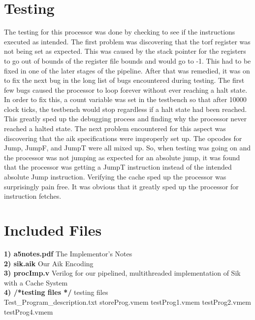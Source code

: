 \documentclass[12pt, twocolumn]{scrartcl}
\begin{document}
\section*{Testing}
The testing for this processor was done by checking to see if the instructions executed as intended. The first problem was discovering that the torf register was not being set as expected. This was caused by the stack pointer for the registers to go out of bounds of the register file bounds and would go to -1. This had to be fixed in one of the later stages of the pipeline. After that was remedied, it was on to fix the next bug in the long list of bugs encountered during testing. 
The first few bugs caused the processor to loop forever without ever reaching a halt state. In order to fix this, a count variable was set in the testbench so that after 10000 clock ticks, the testbench would stop regardless if a halt state had been reached. This greatly sped up the debugging process and finding why the processor never reached a halted state. 
The next problem encountered for this aspect was discovering that the aik specifications were improperly set up. The opcodes for Jump, JumpF, and JumpT were all mixed up. So, when testing was going on and the processor was not jumping as expected for an absolute jump, it was found that the processor was getting a JumpT instruction instead of the intended absolute Jump instruction.
Verifying the cache sped up the processor was surprisingly pain free. It was obvious that it greatly sped up the processor for instruction fetches.

\section*{Included Files}
\textbf {1) a5notes.pdf} The Implementor's Notes \\
\textbf {2) sik.aik} Our Aik Encoding \\
\textbf {3) procImp.v} Verilog for our pipelined, multithreaded implementation of Sik with a Cache System \\
\textbf {4) /*testing files */} testing files \\
Test_Program_description.txt
storeProg.vmem
testProg1.vmem
testProg2.vmem
testProg4.vmem
\end{document}
